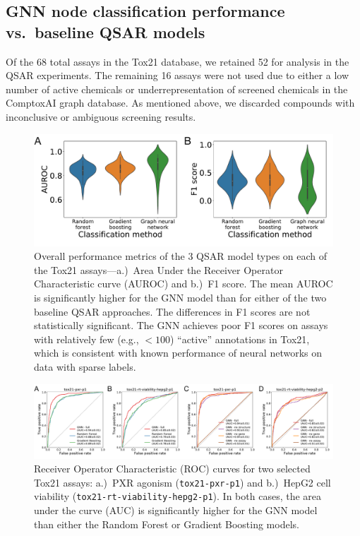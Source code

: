 \documentclass{ws-procs11x85}
\begin{document}
\subsection{GNN node classification performance vs.\ baseline QSAR models}
Of the 68 total assays in the Tox21 database, we retained 52 for analysis in the QSAR experiments.
The remaining 16 assays were not used due to either a low number of active chemicals or underrepresentation of screened chemicals in the ComptoxAI graph database.
As mentioned above, we discarded compounds with inconclusive or ambiguous screening results.

\begin{figure}
   \centering
   \includegraphics[width=\textwidth]{figures/figure2.pdf}
   \caption{Overall performance metrics of the 3 QSAR model types on each of the Tox21 assays---a.)~Area Under the Receiver Operator Characteristic curve (AUROC) and b.)~F1 score. The mean AUROC is significantly higher for the GNN model than for either of the two baseline QSAR approaches. The differences in F1 scores are not statistically significant. The GNN achieves poor F1 scores on assays with relatively few (e.g., $< 100$) ``active'' annotations in Tox21, which is consistent with known performance of neural networks on data with sparse labels.}\label{fig:3}
\end{figure}

\begin{figure}
   \centering
   \includegraphics[width=\textwidth]{figures/figure3.pdf}
   \caption{Receiver Operator Characteristic (ROC) curves for two selected Tox21 assays: a.)~PXR agonism (\texttt{tox21-pxr-p1}) and b.)~HepG2 cell viability (\texttt{tox21-rt-viability-hepg2-p1}). In both cases, the area under the curve (AUC) is significantly higher for the GNN model than either the Random Forest or Gradient Boosting models.}\label{fig:4}
\end{figure}
\end{document}
